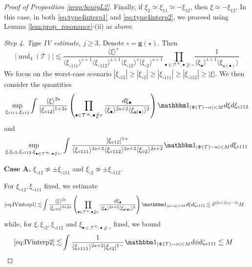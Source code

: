 \documentclass[a4paper,
11pt,  reqno]{amsart}
\newcommand{\jap}[1]{\langle #1 \rangle}
\newcommand{\5}{\textup{V}}
\newcommand{\noi}{\noindent}
\newcommand{\ind}{\mathbbm 1}
\theoremstyle{remark}
\newcommand{\bul}{\bullet}
\newcommand{\TT}{\mathcal{T}}
\newcommand{\gb}{\mathbf{g}}
\newcommand{\sbf}{\mathbf{s}}
\DeclareMathOperator{\mul}{mul}
\numberwithin{equation}{section}
\numberwithin{theorem}{section}
\begin{document}
\begin{proof}[Proof of Proposition \ref{prop:bourgL2}]
Finally, if $\xi_2\simeq \xi_{11}\simeq-\xi_{12}$, then $\xi\simeq -\xi_{12}$. In this case, in both \eqref{eq:type4interp1} and \eqref{eq:type4interp2}, we proceed using Lemma \ref{lem:prop_resonance}-(ii) as above.

\medskip

\noi \textit{Step 4. Type IV estimate, $j\ge3$.}
Denote $\circ=\gb(\star)$. Then
\begin{equation}\label{eq:typeIVmult}
|\mul_4(\TT)|\lesssim \frac{\jap{\xi}^{s}}{\jap{\xi_{\circ111}}^{s+1}\jap{\xi_{\circ112}}^{s+1}\jap{\xi_{\circ12}}^{s}\jap{\xi_{\circ2}}^{s+1}} \prod_{\bul\in\TT^\infty, \bul\ngeq\circ} \frac{1}{\jap{\xi_\bul}^{s+1}\jap{\xi_{\sbf(\bul)}}}
\end{equation}
We focus on the worst-case scenario $|\xi_{\circ12}|\ge |\xi_{\circ 2}|\ge |\xi_{\circ 111}| \ge |\xi_{\circ 112}| \ge |\xi|$. We then consider the quantities
\begin{equation}\label{eq:IVinterp1}
\sup_{\xi_{\circ111}, \xi_{\circ12}}\int \frac{\jap{\xi}^{2s}}{|\xi_{\circ12}|^{1+2s}}\left(\prod_{\bul\in\TT^\infty, \bul\ngeq\circ} \frac{d\xi_\bul}{\jap{\xi_\bul}^{2s+2}\jap{\xi_{\sbf(\bul)}}^2}\right) \ind_{|\Psi(\TT)-\alpha|<M}d\xi d\xi_{\circ112}
\end{equation}
and
\begin{equation}\label{eq:IVinterp2}
\sup_{\xi, \xi_{\circ2}, \xi_{\circ112}, \xi_{\bul\in\TT^\infty, \bul\ngeq\circ}, }\int \frac{|\xi_{\circ12}|^{1+}}{\jap{\xi_{\circ111}}^{2s+2}\jap{\xi_{\circ112}}^{2s+2}\jap{\xi_{\circ2}}^{2s+2}}\ind_{|\Psi(\TT)-\alpha|<M} d\xi_{\circ111}
\end{equation}

\smallskip
\noi\textbf{Case A.} $\xi_{\circ12}\not\simeq \pm \xi_{\circ111}$ and $\xi_{\circ2}\not\simeq \pm \xi_{\circ112}$.

\noi For $\xi_{\circ12}, \xi_{\circ111}$ fixed, we estimate
\begin{align*}
\eqref{eq:IVinterp1}\lesssim & \int \frac{\jap{\xi}^{2s}}{|\xi_{\circ12}|^{3+2s}}\left(\prod_{\bul\in\TT^\infty, \bul\ngeq\circ} \frac{d\xi_\bul}{\jap{\xi_\bul}^{2s+2}\jap{\xi_{\sbf(\bul)}}^2}\right) \ind_{|\phi-\alpha|<M}d\xi d\zeta_{\circ112}\lesssim \delta^{(2s+2)(j-3)}M
\end{align*}
while, for $\xi, \xi_{\circ2}, \xi_{\circ112}$ and $\xi_{\bul\in \TT^\infty, \bul\ngeq \circ}$ fixed, we bound
\begin{align*}
\eqref{eq:IVinterp2} \lesssim & \int \frac{1}{\jap{\xi_{\circ111}}^{2s+2}|\xi_{\circ2}|^{1-}}\ind_{|\Psi(\TT)-\alpha|<M} d\phi d\zeta_{\circ111} \lesssim M
\end{align*}


\end{proof}
\end{document}
